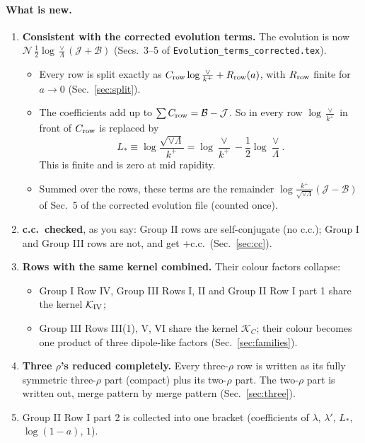 \documentclass[10pt]{article}
\numberwithin{equation}{section}
\newcommand{\Ls}{L_{*}}
\newcommand{\KK}{\mathcal K}
\newcommand{\JJ}{\mathcal J}
\newcommand{\BB}{\mathcal B}
\newcommand{\NN}{\mathcal N}
\begin{document}
\paragraph{What is new.}
\begin{enumerate}
\item \textbf{Consistent with the corrected evolution terms.} The evolution is now $\NN\,\frac12\log\frac{\vee}{\Lambda}(\JJ+\BB)$ (Secs.~3--5 of \texttt{Evolution\_terms\_corrected.tex}).
\begin{itemize}
\item Every row is split exactly as $C_{\rm row}\log\frac{\vee}{k^+}+R_{\rm row}(a)$, with $R_{\rm row}$ finite for $a\to0$ (Sec.~\ref{sec:split}).
\item The coefficients add up to $\sum C_{\rm row}=\BB-\JJ$. So in every row $\log\frac{\vee}{k^+}$ in front of $C_{\rm row}$ is replaced by
\begin{equation*}
\Ls\equiv\log\frac{\sqrt{\vee\Lambda}}{k^+}=\log\frac{\vee}{k^+}-\frac12\log\frac{\vee}{\Lambda}.
\end{equation*}
This is finite and is zero at mid rapidity.
\item Summed over the rows, these terms are the remainder $\log\frac{k^+}{\sqrt{\vee\Lambda}}(\JJ-\BB)$ of Sec.~5 of the corrected evolution file (counted once).
\end{itemize}
\item \textbf{c.c.\ checked}, as you say: Group II rows are self-conjugate (no c.c.); Group I and Group III rows are not, and get $+$c.c.\ (Sec.~\ref{sec:cc}).
\item \textbf{Rows with the same kernel combined.} Their colour factors collapse:
\begin{itemize}
\item Group I Row IV, Group III Rows I, II and Group II Row I part 1 share the kernel $\KK_{\rm IV}$;
\item Group III Rows III(1), V, VI share the kernel $\KK_C$; their colour becomes one product of three dipole-like factors (Sec.~\ref{sec:families}).
\end{itemize}
\item \textbf{Three $\rho$'s reduced completely.} Every three-$\rho$ row is written as its fully symmetric three-$\rho$ part (compact) plus its two-$\rho$ part. The two-$\rho$ part is written out, merge pattern by merge pattern (Sec.~\ref{sec:three}).
\item Group II Row I part 2 is collected into one bracket (coefficients of $\lambda$, $\lambda'$, $\Ls$, $\log(1-a)$, $1$).
\end{enumerate}
\end{document}
